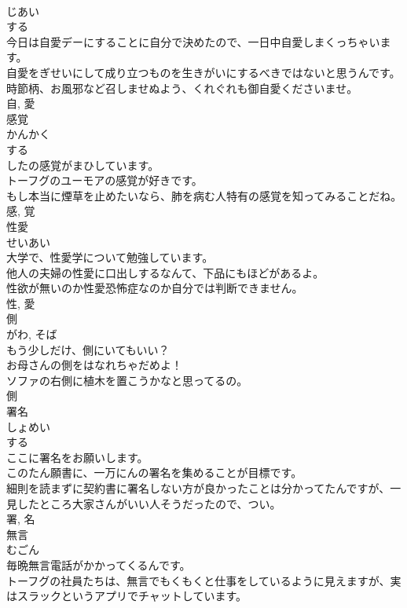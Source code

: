 \documentclass[8pt]{extreport}
\begin{document}
\begin{CJK}{UTF8}{min}
\\	じあい	
\\	する 
\\	今日は自愛デーにすることに自分で決めたので、一日中自愛しまくっちゃいます。	
\\	自愛をぎせいにして成り立つものを生きがいにするべきではないと思うんです。	
\\	時節柄、お風邪など召しませぬよう、くれぐれも御自愛くださいませ。	
\\	自, 愛	
\\	感覚	
\\	かんかく	
\\	する 
\\	したの感覚がまひしています。	
\\	トーフグのユーモアの感覚が好きです。	
\\	もし本当に煙草を止めたいなら、肺を病む人特有の感覚を知ってみることだね。	
\\	感, 覚	
\\	性愛	
\\	せいあい	
\\	大学で、性愛学について勉強しています。	
\\	他人の夫婦の性愛に口出しするなんて、下品にもほどがあるよ。	
\\	性欲が無いのか性愛恐怖症なのか自分では判断できません。	
\\	性, 愛	
\\	側	
\\	がわ, そば	
\\	もう少しだけ、側にいてもいい？	
\\	お母さんの側をはなれちゃだめよ！	
\\	ソファの右側に植木を置こうかなと思ってるの。	
\\	側	
\\	署名	
\\	しょめい	
\\	する 
\\	ここに署名をお願いします。	
\\	このたん願書に、一万にんの署名を集めることが目標です。	
\\	細則を読まずに契約書に署名しない方が良かったことは分かってたんですが、一見したところ大家さんがいい人そうだったので、つい。	
\\	署, 名	
\\	無言	
\\	むごん	
\\	毎晩無言電話がかかってくるんです。	
\\	トーフグの社員たちは、無言でもくもくと仕事をしているように見えますが、実はスラックというアプリでチャットしています。	

\end{CJK}
\end{document}
